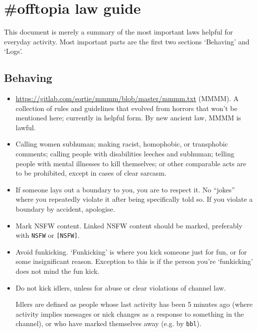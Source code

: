 \documentclass[11pt]{article}
\begin{document}
\section{\#offtopia law guide}

This document is merely a summary of the most important laws helpful for everyday
activity. Most important parts are the first two sections `Behaving' and `Logs'.


\subsection{Behaving}

\begin{itemize}
\item \url{https://gitlab.com/sortie/mmmm/blob/master/mmmm.txt} (MMMM).
A collection of rules and guidelines that evolved from horrors that won't be mentioned
here; currently in helpful form. By new ancient law, MMMM is lawful.

\item Calling women subhuman; making racist, homophobic, or transphobic
comments; calling people with disabilities leeches and subhuman;
telling people with mental illnesses to kill themselves; or other comparable acts
are to be prohibited, except in cases of clear sarcasm.

\item If someone lays out a boundary to you, you are to respect it. No ``jokes'' where you
repeatedly violate it after being specifically told so. If you violate a boundary by accident,
apologise.

\item Mark NSFW content. Linked NSFW content should be marked, preferably with
\texttt{NSFW} or \texttt{[NSFW]}.

\item Avoid funkicking.
`Funkicking' is where you kick someone just for fun, or for some insignificant reason.
Exception to this is if the person you're `funkicking' does not mind the fun kick.

\item Do not kick idlers, unless for abuse or clear violations of channel law.

Idlers are defined as people whose last activity has been 5 minutes ago (where activity
implies messages or nick changes as a response to something in the channel), or who
have marked themselves away (e.g. by \texttt{bbl}).
\end{itemize}
\end{document}
